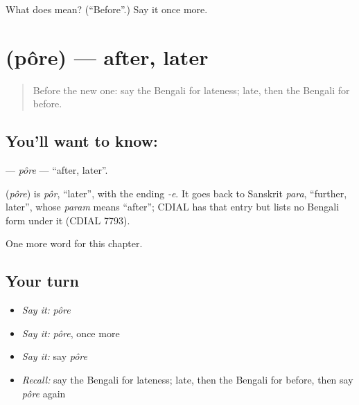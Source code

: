 \begin{tcolorbox}[breakable,colback=teal!4,colframe=teal!35!black,title={Before you move on}]
What does  mean? (\textquotedblleft{}Before\textquotedblright{}.) Say it once more.
\end{tcolorbox}
\section[\texorpdfstring{\bn{পরে} (pôre)}{পরে (pôre)}]{ (pôre) — after, later}

\label{lesson:BN-C80-pore}



\begin{quote}
Before the new one: say the Bengali for lateness; late, then the Bengali for before.
\end{quote}

\subsection*{You'll want to know: }
\textbf{} — \emph{pôre} — \textquotedblleft{}after, later\textquotedblright{}.

\begin{cousinweb}
\textbf{} (\emph{pôre}) is \emph{pôr}, \textquotedblleft{}later\textquotedblright{}, with the ending \emph{-e}. It goes back to Sanskrit \emph{para}, \textquotedblleft{}further, later\textquotedblright{}, whose \emph{param} means \textquotedblleft{}after\textquotedblright{}; CDIAL has that entry but lists no Bengali form under it (CDIAL 7793).
\end{cousinweb}

\begin{grammarlens}[title={What you've built}]
One more word for this chapter.
\end{grammarlens}

\subsection*{Your turn}
\begin{itemize}
\raggedright
  \item \emph{Say it:} \emph{pôre}
  \item \emph{Say it:} \emph{pôre}, once more
  \item \emph{Say it:} say \emph{pôre}
  \item \emph{Recall:} say the Bengali for lateness; late, then the Bengali for before, then say \emph{pôre} again
\end{itemize}

